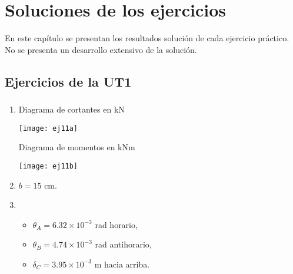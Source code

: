 %
%
%

\chapter{Soluciones de los ejercicios}

En este capítulo se presentan los resultados solución de cada ejercicio práctico. No se presenta un desarrollo extensivo de la solución.

\section{Ejercicios de la UT1}

\subsection{}

\begin{enumerate}[label=\alph*)]
\item Diagrama de cortantes en kN

\begin{center}
	\texttt{[image: ej11a]}
\end{center}

Diagrama de momentos en kNm

\begin{center}
	\texttt{[image: ej11b]}
\end{center}

\item  $b = 15$ cm.
\item
\begin{itemize}
	\item $\theta_A = 6.32 \times 10^{-3}$ rad  horario,
	\item $\theta_B = 4.74 \times 10^{-3}$ rad antihorario,
	\item $\delta_C = 3.95 \times 10^{-3}$ m hacia arriba.
\end{itemize}
\end{enumerate}


